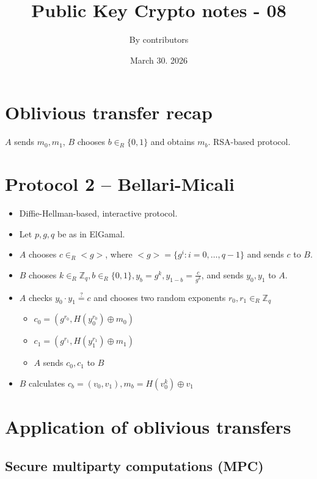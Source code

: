 \documentclass[11pt]{article}
\theoremstyle{definition}
\theoremstyle{proof}
\begin{document}
\title{Public Key Crypto notes - 08}
\author{By contributors}
\date{March 30. 2026}
\maketitle

\section{Oblivious transfer recap}

$A$ sends $m_0, m_1$, $B$ chooses $b \in_R \{0, 1\}$ and obtains $m_b$. RSA-based protocol.

\section{Protocol 2 -- Bellari-Micali}

\begin{itemize}
	\item Diffie-Hellman-based, interactive protocol.
	\item Let $p, g, q$ be as in ElGamal.
	\item $A$ chooses $c \in_R <g>$, where $<g> = \{g^i: i = 0, \dots, q-1\}$ and sends $c$ to $B$.
	\item $B$ chooses $k \in_R \mathbb{Z}_q, b \in_R \{0, 1\}, y_b = g^k, y_{1-b} = \frac{c}{g^k}$, and sends $y_0, y_1$ to $A$.
	\item $A$ checks $y_0 \cdot y_1 \stackrel{?}{=} c$ and chooses two random exponents $r_0, r_1 \in_R \mathbb{Z}_q$
	\begin{itemize}
		\item $c_0 = (g^{r_0}, H(y_0^{r_0}) \oplus m_0)$
		\item $c_1 = (g^{r_1}, H(y_1^{r_1}) \oplus m_1)$
		\item $A$ sends $c_0, c_1$ to $B$
	\end{itemize}
	\item $B$ calculates $c_b = (v_0, v_1), m_b = H(v_0^k) \oplus v_1$
\end{itemize}

\section{Application of oblivious transfers}

\subsection{Secure multiparty computations (MPC)}
\end{document}
